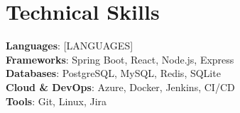 \documentclass[letterpaper,11pt]{article}
\begin{document}
\section{Technical Skills}
 \begin{itemize}[leftmargin=0.15in, label={}]
    \small{\item{
     \textbf{Languages}{: [LANGUAGES]} \\
     \textbf{Frameworks}{: Spring Boot, React, Node.js, Express} \\
     \textbf{Databases}{: PostgreSQL, MySQL, Redis, SQLite} \\
     \textbf{Cloud \& DevOps}{: Azure, Docker, Jenkins, CI/CD} \\
     \textbf{Tools}{: Git, Linux, Jira}
    }}
 \end{itemize}

\end{document}
